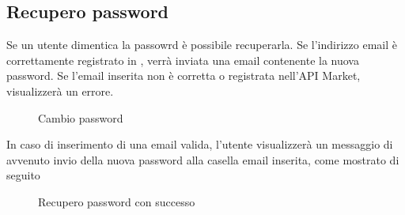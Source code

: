 \subsection{Recupero password}
Se un utente dimentica la passowrd è possibile recuperarla. Se l'indirizzo email è correttamente registrato in \progetto, verrà inviata una email contenente la nuova password. Se l'email inserita non è corretta o registrata nell'API Market, visualizzerà un errore.
\label{Cambio password}
\begin{figure}[H]
	\centering
	\caption{Cambio password}
\end{figure}
In caso di inserimento di una email valida, l'utente visualizzerà un messaggio di avvenuto invio della nuova password alla casella email inserita, come mostrato di seguito 

\label{Recupero password con successo}
\begin{figure}[H]
	\centering
	\caption{Recupero password con successo}
\end{figure}

